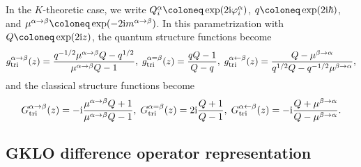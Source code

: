 \begin{remark}
    In the $K$-theoretic case, we write $Q_i^\alpha \coloneq \exp(2 \I \varphi_i^\alpha)$, $q \coloneq \exp(2\I \hbar)$, and $\mu^{\alpha\to\beta} \coloneq \exp(-2\I m^{\alpha\to\beta})$. In this parametrization with $Q \coloneq \exp(2\I z)$, the quantum structure functions become
    \begin{align}
		g_\textup{tri}^{\alpha \to \beta}(z) = \frac{q^{-1/2} \mu^{\alpha\to\beta} Q-q^{1/2}}{\mu^{\alpha\to\beta} Q-1}, \;
		g_\textup{tri}^{\alpha = \beta}(z) = \frac{q Q-1}{Q-q}, \;
		g_\textup{tri}^{\alpha \leftarrow \beta}(z) = \frac{Q-\mu^{\beta\to\alpha}}{q^{1/2} Q-q^{-1/2} \mu^{\beta\to\alpha}},
	\end{align}
    and the classical structure functions become
    \begin{align}
		G_\textup{tri}^{\alpha \to \beta}(z) = -\mathrm{i} \frac{\mu^{\alpha\to\beta} Q+1}{\mu^{\alpha\to\beta} Q-1}, \;
		G_\textup{tri}^{\alpha = \beta}(z) = 2\mathrm{i} \frac{Q+1}{Q-1}, \;
		G_\textup{tri}^{\alpha \leftarrow \beta}(z) = -\mathrm{i} \frac{Q+\mu^{\beta\to\alpha}}{Q-\mu^{\beta\to\alpha}}.
	\end{align}
\end{remark}

\subsection{GKLO difference operator representation}


